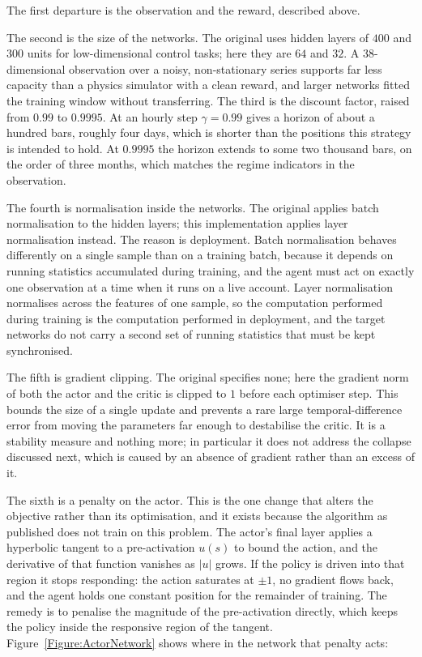 

The first departure is the observation and the reward, described above.

The second is the size of the networks. The original uses hidden layers of $400$ and $300$ units for low-dimensional control tasks; here they are $64$ and $32$. A $38$-dimensional observation over a noisy, non-stationary series supports far less capacity than a physics simulator with a clean reward, and larger networks fitted the training window without transferring. The third is the discount factor, raised from $0.99$ to $0.9995$. At an hourly step $\gamma = 0.99$ gives a horizon of about a hundred bars, roughly four days, which is shorter than the positions this strategy is intended to hold. At $0.9995$ the horizon extends to some two thousand bars, on the order of three months, which matches the regime indicators in the observation.

The fourth is normalisation inside the networks. The original applies batch normalisation to the hidden layers; this implementation applies layer normalisation instead. The reason is deployment. Batch normalisation behaves differently on a single sample than on a training batch, because it depends on running statistics accumulated during training, and the agent must act on exactly one observation at a time when it runs on a live account. Layer normalisation normalises across the features of one sample, so the computation performed during training is the computation performed in deployment, and the target networks do not carry a second set of running statistics that must be kept synchronised.

The fifth is gradient clipping. The original specifies none; here the gradient norm of both the actor and the critic is clipped to $1$ before each optimiser step. This bounds the size of a single update and prevents a rare large temporal-difference error from moving the parameters far enough to destabilise the critic. It is a stability measure and nothing more; in particular it does not address the collapse discussed next, which is caused by an absence of gradient rather than an excess of it.

The sixth is a penalty on the actor. This is the one change that alters the objective rather than its optimisation, and it exists because the algorithm as published does not train on this problem. The actor's final layer applies a hyperbolic tangent to a pre-activation $u(s)$ to bound the action, and the derivative of that function vanishes as $|u|$ grows. If the policy is driven into that region it stops responding: the action saturates at $\pm 1$, no gradient flows back, and the agent holds one constant position for the remainder of training. The remedy is to penalise the magnitude of the pre-activation directly, which keeps the policy inside the responsive region of the tangent. Figure~\ref{Figure:ActorNetwork} shows where in the network that penalty acts:

